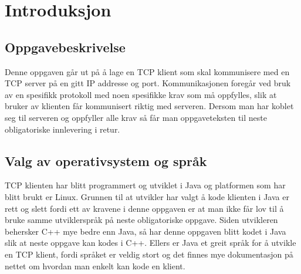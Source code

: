 \section{Introduksjon}
\subsection{Oppgavebeskrivelse}
Denne oppgaven går ut på å lage en TCP klient som skal kommunisere med en TCP server på en gitt IP addresse og port. Kommunikasjonen foregår ved bruk av en spesifikk protokoll med noen spesifikke krav som må oppfylles, slik at bruker av klienten får kommunisert riktig med serveren. Dersom man har koblet seg til serveren og oppfyller alle krav så får man oppgaveteksten til neste obligatoriske innlevering i retur.

\subsection{Valg av operativsystem og språk}
TCP klienten har blitt programmert og utviklet i Java og platformen som har blitt brukt er Linux. Grunnen til at utvikler har valgt å kode klienten i Java er rett og slett fordi ett av kravene i denne oppgaven er at man ikke får lov til å bruke samme utviklerspråk på neste obligatoriske oppgave. Siden utvikleren behersker C++ mye bedre enn Java, så har denne oppgaven blitt kodet i Java slik at neste oppgave kan kodes i C++. Ellers er Java et greit språk for å utvikle en TCP klient, fordi språket er veldig stort og det finnes mye dokumentasjon på nettet om hvordan man enkelt kan kode en klient.
